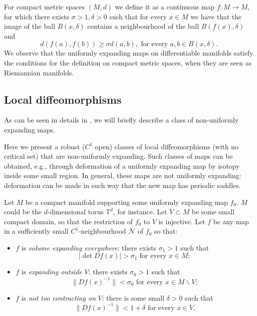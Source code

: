 \documentclass[12pt,a4paper]{amsart}
\theoremstyle{plain}
\begin{document}
For compact metric spaces $(M,d)$ we define it as a continuous map $f:M \to M$, for which there exists $\sigma > 1, \delta>0$ such that for every $x \in M$ we have that the image of the ball $B(x,\delta)$ contains a neighbourhood of the ball $B(f(x),\delta)$ and
\[
d(f(a),f(b)) \geq \sigma d(a,b), \,\, \text{for every} \,\, a,b \in B(x,\delta).
\]
We observe that the uniformly expanding maps on differentiable manifolds satisfy the conditions for the definition on compact metric spaces, when they are seen as Riemannian manifolds.

\subsection{Local diffeomorphisms}\label{local} As can be seen in details in \cite{A}, we will briefly describe a class of non-uniformly expanding maps.

Here we present a robust ($C^{1}$ open) classes of local diffeomorphisms (with no critical set) that are non-uniformly expanding. Such classes of maps can be obtained, e.g., through deformation of a uniformly expanding map by isotopy inside some small region. In general, these maps are not uniformly expanding: deformation can be made in such way that the new map has periodic saddles.

Let $M$ be a compact manifold supporting some uniformly expanding map $f_{0}$. $M$ could be the $d$-dimensional torus $\mathbb{T}^{d}$, for instance. Let $V \subset M$ be some small compact domain, so that the restriction of $f_{0}$ to $V$ is injective. Let $f$ be any map in a sufficiently small $C^{1}$-neighbourhood $\mathcal{N}$ of $f_{0}$ so that:

\begin{itemize}
	\item $f$ is \textit{volume expanding everywhere}: there exists $\sigma_{1} > 1$ such that
	\[
	|\det Df(x)| > \sigma_{1} \,\, \text{for every} \,\, x \in M;
	\]	
	
	\item $f$ is \textit{expanding outside} $V$: there exists $\sigma_{0} > 1$ such that
	\[
	\|Df(x)^{-1}\| < \sigma_{0} \,\, \text{for every} \,\, x \in M \backslash V;
	\] 
	
	\item $f$ is \textit{not too contracting on} $V$: there is some small $\delta > 0$ such that
	\[
	\|Df(x)^{-1}\| < 1 + \delta \,\, \text{for every} \,\, x \in V.
	\]
\end{itemize}
\end{document}
